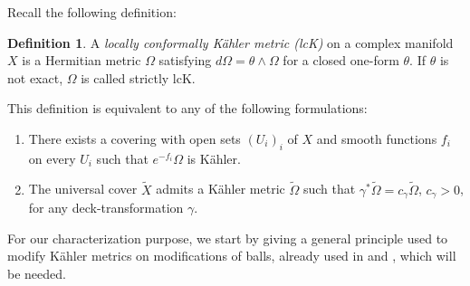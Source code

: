 \documentclass[11pt]{article}
\theoremstyle{definition}
\newtheorem{definition}[theorem]{Definition}
\let\wt\widetilde
\begin{document}
Recall the following definition:
\begin{definition}\label{deflck} A \emph{locally conformally Kähler metric (lcK)} on a complex manifold~$X$ is a Hermitian metric $\Omega$ satisfying $d\Omega=\theta\wedge\Omega$ for a closed one-form $\theta$. If $\theta$ is not exact, $\Omega$ is called strictly lcK.
\end{definition}

This definition is equivalent to any of the following formulations:
\begin{enumerate}
\item There exists a covering with open sets $(U_i)_i$ of $X$ and smooth functions $f_i$ on every $U_i$ such that $e^{-f_i}\Omega$ is Kähler.
\item The universal cover $\wt{X}$ admits a Kähler metric $\wt{\Omega}$ such that $\gamma^*\wt{\Omega}=c_{\gamma}\wt{\Omega}$, $c_{\gamma}>0$, for any deck-transformation $\gamma$.
\end{enumerate}

For our characterization purpose, we start by giving a general principle used to modify Kähler metrics on modifications of balls, already used in \cite{bru} and \cite{iop}, which will be needed.
\end{document}

